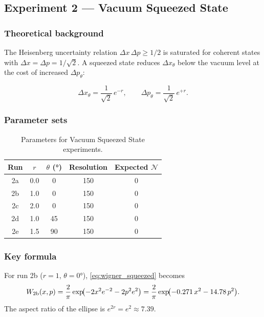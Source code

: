 \documentclass[12pt,a4paper]{article}
\begin{document}
\subsection{Experiment 2 — Vacuum Squeezed State}
\label{sec:exp2}

\subsubsection*{Theoretical background}

The Heisenberg uncertainty relation $\Delta x\,\Delta p \ge 1/2$ is saturated for coherent states with $\Delta x=\Delta p=1/\sqrt{2}$. A squeezed state reduces $\Delta x_\theta$ below the vacuum level at the cost of increased $\Delta p_\theta$:

\begin{equation}
  \Delta x_\theta = \frac{1}{\sqrt{2}}\,e^{-r}, \qquad
  \Delta p_\theta = \frac{1}{\sqrt{2}}\,e^{+r}.
\end{equation}

\subsubsection*{Parameter sets}

\begin{table}[H]
  \centering
  \caption{Parameters for Vacuum Squeezed State experiments.}
  \label{tab:squeezed_params}
  \begin{tabular}{ccccc}
    \toprule
    \textbf{Run} & $r$ & $\theta$ (°) & \textbf{Resolution} & \textbf{Expected $\mathcal{N}$} \\
    \midrule
    2a & 0.0  & 0   & 150 & 0 \\
    2b & 1.0  & 0   & 150 & 0 \\
    2c & 2.0  & 0   & 150 & 0 \\
    2d & 1.0  & 45  & 150 & 0 \\
    2e & 1.5  & 90  & 150 & 0 \\
    \bottomrule
  \end{tabular}
\end{table}

\subsubsection*{Key formula}

For run 2b ($r=1$, $\theta=0°$), \cref{eq:wigner_squeezed} becomes
\begin{equation}
  W_{\rm 2b}(x,p) = \frac{2}{\pi}\exp\!\bigl(-2x^2 e^{-2}-2p^2 e^{2}\bigr)
                   = \frac{2}{\pi}\exp\!\bigl(-0.271\,x^2 - 14.78\,p^2\bigr).
\end{equation}
The aspect ratio of the ellipse is $e^{2r}=e^2\approx7.39$.
\end{document}
